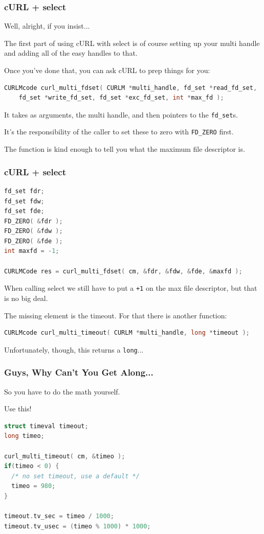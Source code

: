 \begin{frame}[fragile]
	\frametitle{cURL + select}

	Well, alright, if you insist...

	The first part of using cURL with select is of course setting up your multi handle and adding all of the easy handles to that.

	Once you've done that, you can ask cURL to prep things for you:

	\begin{lstlisting}[language=C]
CURLMcode curl_multi_fdset( CURLM *multi_handle, fd_set *read_fd_set,
    fd_set *write_fd_set, fd_set *exc_fd_set, int *max_fd );
\end{lstlisting}

	It takes as arguments, the multi handle, and then pointers to the \texttt{fd\_set}s.

	It's the responsibility of the caller to set these to zero with \texttt{FD\_ZERO} first.

	The function is kind enough to tell you what the maximum file descriptor is.

\end{frame}

\begin{frame}[fragile]
	\frametitle{cURL + select}

	\begin{lstlisting}[language=C]
fd_set fdr;
fd_set fdw;
fd_set fde;
FD_ZERO( &fdr );
FD_ZERO( &fdw );
FD_ZERO( &fde );
int maxfd = -1;

CURLMCode res = curl_multi_fdset( cm, &fdr, &fdw, &fde, &maxfd );
\end{lstlisting}

	When calling select we still have to put a \texttt{+1} on the max file descriptor, but that is no big deal.

	The missing element is the timeout. For that there is another function:

	\begin{lstlisting}[language=C]
CURLMcode curl_multi_timeout( CURLM *multi_handle, long *timeout );
\end{lstlisting}

	Unfortunately, though, this returns a \texttt{long}...

\end{frame}


\begin{frame}[fragile]
	\frametitle{Guys, Why Can't You Get Along...}

	So you have to do the math yourself.

	Use this!

	\begin{lstlisting}[language=C]
struct timeval timeout;
long timeo;
 
curl_multi_timeout( cm, &timeo );
if(timeo < 0) {
  /* no set timeout, use a default */
  timeo = 980;
}
 
timeout.tv_sec = timeo / 1000;
timeout.tv_usec = (timeo % 1000) * 1000;
\end{lstlisting}

\end{frame}


